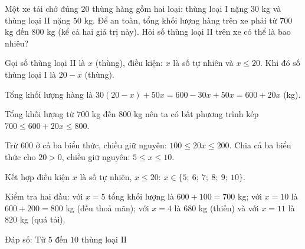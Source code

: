 \begin{problem}[9DS-BPT-047]
Một xe tải chở đúng $20$ thùng hàng gồm hai loại: thùng loại I nặng $30$ kg và thùng loại II nặng $50$ kg. Để an toàn, tổng khối lượng hàng trên xe phải từ $700$ kg đến $800$ kg (kể cả hai giá trị này). Hỏi số thùng loại II trên xe có thể là bao nhiêu?

\begin{solution}
Gọi số thùng loại II là $x$ (thùng), điều kiện: $x$ là số tự nhiên và $x \leq 20$. Khi đó số thùng loại I là $20 - x$ (thùng).

Tổng khối lượng hàng là $30(20 - x) + 50x = 600 - 30x + 50x = 600 + 20x$ (kg).

Tổng khối lượng từ $700$ kg đến $800$ kg nên ta có bất phương trình kép $700 \leq 600 + 20x \leq 800$.

Trừ $600$ ở cả ba biểu thức, chiều giữ nguyên: $100 \leq 20x \leq 200$. Chia cả ba biểu thức cho $20 > 0$, chiều giữ nguyên: $5 \leq x \leq 10$.

Kết hợp điều kiện $x$ là số tự nhiên, $x \leq 20$: $x \in \{5;\ 6;\ 7;\ 8;\ 9;\ 10\}$.

Kiểm tra hai đầu: với $x = 5$ tổng khối lượng là $600 + 100 = 700$ kg; với $x = 10$ là $600 + 200 = 800$ kg (đều thoả mãn); với $x = 4$ là $680$ kg (thiếu) và với $x = 11$ là $820$ kg (quá tải).

Đáp số: $\boxed{\text{Từ } 5 \text{ đến } 10 \text{ thùng loại II}}$
\end{solution}
\end{problem}

